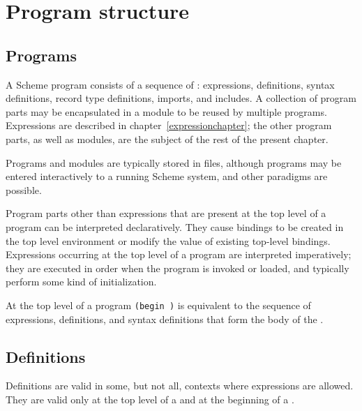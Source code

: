 \chapter{Program structure}
\label{programchapter}

\section{Programs}

A Scheme program consists of a sequence of 
: expressions, definitions, syntax definitions,
record type definitions, imports, and includes.  A collection of program
parts may be encapsulated in a module to be reused by multiple
programs.
Expressions are described in chapter~\ref{expressionchapter};
the other program parts, as well as modules, are the subject of the
rest of the present chapter.

Programs and modules are typically stored in files, although programs
may be entered interactively to a running Scheme system, and other
paradigms are possible.



Program parts other than expressions that are present
at the top level of a program can be interpreted declaratively.
They cause bindings to be created in the top level
environment or modify the value of existing top-level bindings.
Expressions occurring at the top level of a program are
interpreted imperatively; they are executed in order when the program is
invoked or loaded, and typically perform some kind of initialization.


At the top level of a program {\tt(begin  \dotsfoo)} is
equivalent to the sequence of expressions, definitions, and syntax definitions
that form the body of the .


\section{Definitions}
\label{defines}

Definitions are valid in some, but not all, contexts where expressions
are allowed.  They are valid only at the top level of a 
and at the beginning of a .

